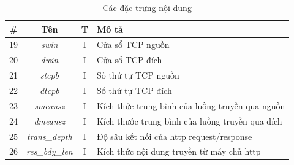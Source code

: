 \begin{table}[H]
    \centering
    \begin{tabular}{|c|c|c|l|}
        \hline
        \textbf{\#}  & \textbf{Tên} & \textbf{T} & \textbf{Mô tả} \\
        \hline
        19 & \textit{swin} & I & Cửa sổ TCP nguồn\\
        \hline
        20 & \textit{dwin} & I & Cửa sổ TCP đích\\
        \hline
        21 & \textit{stcpb} & I & Số thứ tự TCP nguồn\\
        \hline
        22 & \textit{dtcpb} & I & Số thứ tự TCP đích\\
        \hline
        23 & \textit{smeansz} & I & Kích thức trung bình của luồng truyền qua nguồn\\
        \hline
        24 & \textit{dmeansz} & I & Kích thước trung bình của luồng truyền qua đích\\
        \hline
        25 & \textit{trans\_depth} & I & Độ sâu kết nối của http request/response\\
        \hline
        26 & \textit{res\_bdy\_len} & I & Kích thức nội dung truyền từ máy chủ http \\
        \hline
    \end{tabular}
    \caption{Các đặc trưng nội dung}
    
\end{table}

